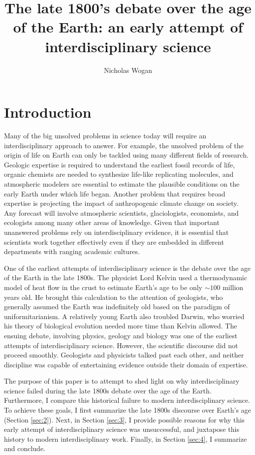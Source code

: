 \documentclass[12pt]{article}
\begin{document}
\title{The late 1800's debate over the age of the Earth: an early attempt of interdisciplinary science}
\author{Nicholas Wogan}
\maketitle

\section{Introduction}

Many of the big unsolved problems in science today will require an interdisciplinary approach to answer. For example, the unsolved problem of the origin of life on Earth can only be tackled using many different fields of research. Geologic expertise is required to understand the earliest fossil records of life, organic chemists are needed to synthesize life-like replicating molecules, and atmospheric modelers are essential to estimate the plausible conditions on the early Earth under which life began. Another problem that requires broad expertise is projecting the impact of anthropogenic climate change on society. Any forecast will involve atmospheric scientists, glaciologists, economists, and ecologists among many other areas of knowledge. Given that important unanswered problems rely on interdisciplinary evidence, it is essential that scientists work together effectively even if they are embedded in different departments with ranging academic cultures.

One of the earliest attempts of interdisciplinary science is the debate over the age of the Earth in the late 1800s. The physicist Lord Kelvin used a thermodynamic model of heat flow in the crust to estimate Earth's age to be only $\sim 100$ million years old. He brought this calculation to the attention of geologists, who generally assumed the Earth was indefinitely old based on the paradigm of uniformitarianism. A relatively young Earth also troubled Darwin, who worried his theory of biological evolution needed more time than Kelvin allowed. The ensuing debate, involving physics, geology and biology was one of the earliest attempts of interdisciplinary science. However, the scientific discourse did not proceed smoothly. Geologists and physicists talked past each other, and neither discipline was capable of entertaining evidence outside their domain of expertise.

The purpose of this paper is to attempt to shed light on why interdisciplinary science failed during the late 1800s debate over the age of the Earth. Furthermore, I compare this historical failure to modern interdisciplinary science. To achieve these goals, I first summarize the late 1800s discourse over Earth's age (Section \ref{sec:2}). Next, in Section \ref{sec:3}, I provide possible reasons for why this early attempt of interdisciplinary science was unsuccessful, and juxtapose this history to modern interdisciplinary work. Finally, in Section \ref{sec:4}, I summarize and conclude.
\end{document}
